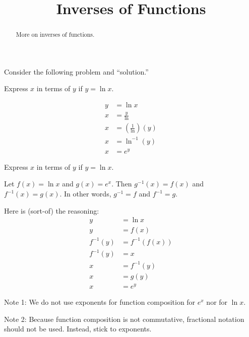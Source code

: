\documentclass[space,nooutcomes]{ximera}
\title{Inverses of Functions}
\begin{document}
\begin{abstract}
More on inverses of functions.
\end{abstract}
\maketitle

Consider the following problem and ``solution.''

\begin{problem}

Express $x$ in terms of $y$ if $y = \ln x$.  
\begin{solution}
\begin{align*}
y & = \ln x \\
x & = \frac{y}{\ln} \\
x & = \left(\frac{1}{\ln}\right)\left(y\right) \\
x & = \ln^{-1}(y) \\
x & = e^y
\end{align*}
\end{solution}
\end{problem}

\begin{problem}
Express $x$ in terms of $y$ if $y = \ln x$.  
\begin{solution}
Let $f(x) = \ln x$ and $g(x) = e^x$.  Then $g^{-1}(x) = f(x)$ and $f^{-1}(x) = g(x)$.  In other words, $g^{-1} = f$ and $f^{-1}=g$.  

Here is (sort-of) the reasoning:  
\begin{align*}
y & = \ln x \\
y & = f(x) \\
f^{-1}(y) & = f^{-1}(f(x)) \\
f^{-1}(y) & = x \\
x & = f^{-1}(y) \\
x & = g(y) \\
x & = e^y
\end{align*}
\end{solution}

Note 1:  We do not use exponents for function composition for $e^x$ nor for $\ln x$.  

Note 2: Because function composition is not commutative, 
fractional notation should not be used.  Instead, stick to exponents.  

\end{problem}
\end{document}
